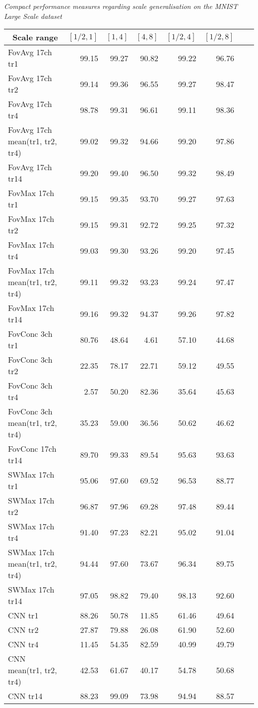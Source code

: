 \documentclass[twocolumn,runningheads]{svjour3}
\begin{document}
\begin{table*}[tp]
\setlength{\tabcolsep}{6pt} \begin{center}
  {\em Compact performance measures regarding scale generalisation on
    the MNIST Large Scale dataset}

  \medskip

\begin{tabular}{l r r r r r r r}
\hline
\ Scale range & $[1/2,1]$ & $[1,4]$  & $[4,8]$ & $[1/2, 4]$ & $[1/2,8]$  \\ 
\hline
FovAvg 17ch tr1  &  99.15 & 99.27 & 90.82 & 99.22 & 96.76\\
FovAvg 17ch tr2  &  99.14 & 99.36 & 96.55 & 99.27 & 98.47\\
FovAvg 17ch tr4  &  98.78 & 99.31 & 96.61 & 99.11 & 98.36\\
FovAvg 17ch mean(tr1, tr2, tr4)  &  99.02 & 99.32 & 94.66 & 99.20 & 97.86\\
FovAvg 17ch tr14  &  99.20 & 99.40 & 96.50 & 99.32 & 98.49\\
\hline
FovMax 17ch tr1  &  99.15 & 99.35 & 93.70 & 99.27 & 97.63\\
FovMax 17ch tr2  &  99.15 & 99.31 & 92.72 & 99.25 & 97.32\\
FovMax 17ch tr4  &  99.03 & 99.30 & 93.26 & 99.20 & 97.45\\
FovMax 17ch mean(tr1, tr2, tr4)  &  99.11 & 99.32 & 93.23 & 99.24 & 97.47\\
FovMax 17ch tr14  &  99.16 & 99.32 & 94.37 & 99.26 & 97.82\\
\hline
FovConc 3ch tr1  &  80.76 & 48.64 & 4.61 & 57.10 & 44.68\\
FovConc 3ch tr2  &  22.35 & 78.17 & 22.71 & 59.12 & 49.55\\
FovConc 3ch tr4  &  2.57 & 50.20 & 82.36 & 35.64 & 45.63\\
FovConc 3ch mean(tr1, tr2, tr4)  &  35.23 & 59.00 & 36.56 & 50.62 & 46.62\\
FovConc 17ch tr14  &  89.70 & 99.33 & 89.54 & 95.63 & 93.63\\
\hline
SWMax 17ch tr1  &  95.06 & 97.60 & 69.52 & 96.53 & 88.77\\
SWMax 17ch tr2  &  96.87 & 97.96 & 69.28 & 97.48 & 89.44\\
SWMax 17ch tr4  &  91.40 & 97.23 & 82.21 & 95.02 & 91.04\\
SWMax 17ch mean(tr1, tr2, tr4)  &  94.44 & 97.60 & 73.67 & 96.34 & 89.75\\
SWMax 17ch tr14  &  97.05 & 98.82 & 79.40 & 98.13 & 92.60\\
\hline
CNN tr1  &  88.26 & 50.78 & 11.85 & 61.46 & 49.64\\
CNN tr2  &  27.87 & 79.88 & 26.08 & 61.90 & 52.60\\
CNN tr4  &  11.45 & 54.35 & 82.59 & 40.99 & 49.79\\
CNN mean(tr1, tr2, tr4)  &  42.53 & 61.67 & 40.17 & 54.78 & 50.68\\
CNN tr14  &  88.23 & 99.09 & 73.98 & 94.94 & 88.57\\
  \hline
\end{tabular}
\end{center}


\end{table*}
\end{document}
